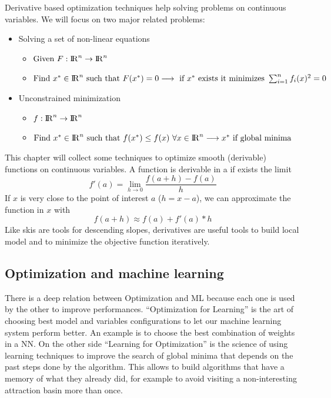 \documentclass[11pt]{article}
\begin{document}
Derivative based optimization techniques help solving problems on continuous variables. We will focus on two major related problems:
\begin{itemize}
\item{Solving a set of non-linear equations \\
	\begin{itemize}
	\item{ $ \text{Given } F : {\rm I\!R}^n \rightarrow {\rm I\!R}^n $ }
	\item{ $ \text{Find } x^\ast \in {\rm I\!R}^n \text{ such that } F(x^\ast) = 0 \longrightarrow \text{ if } x^\ast \text{ exists it minimizes } \sum_{i=1}^{n} f_i(x)^2 = 0 $ }
	\end{itemize}
}\bigskip
\item{
	Unconstrained minimization \\
	\begin{itemize}
	\item{ $ f : {\rm I\!R}^n \rightarrow {\rm I\!R}^n $ }
	\item{ $ \text{Find } x^\ast \in {\rm I\!R}^n \text{ such that } f(x^\ast) \leq f(x) \ \forall x \in {\rm I\!R}^n \longrightarrow x^\ast \text{ if global minima } $ }
	\end{itemize}
}
\end{itemize}
This chapter will collect some techniques to optimize smooth (derivable) functions on continuous variables. A function is derivable in a if exists the limit $$
f'(a) = \lim_{h\to0} \frac{f(a+h) - f(a)}{h} $$ If $x$ is very close to the point of interest $a$ ($h = x-a$), we can approximate the function in $x$ with $$ f(a+h) \approx f(a) + f'(a)*h $$ Like skis are tools for descending slopes, derivatives are useful tools to build local model and to minimize the objective function iteratively.

\subsection{Optimization and machine learning}

There is a deep relation between Optimization and ML because each one is used by the other to improve performances. ``Optimization for Learning'' is the art of choosing best model and variables configurations to let our machine learning system perform better. An example is to choose the best combination of weights in a NN. On the other side ``Learning for Optimization'' is the science of using learning techniques to improve the search of global minima that depends on the past steps done by the algorithm. This allows to build algorithms that have a memory of what they already did, for example to avoid visiting a non-interesting attraction basin more than once.
\end{document}
